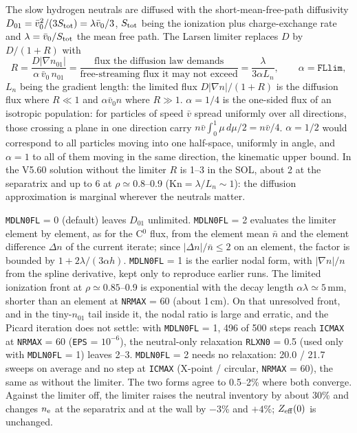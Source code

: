 \documentclass[11pt]{article}
\def\r#1{{\rm#1}}
\def\nee{n_\r{e}}
\begin{document}
The slow hydrogen neutrals are diffused with the short-mean-free-path
diffusivity $D_{01} = \bar v_0^2/(3S_\r{tot}) = \lambda\bar v_0/3$, $S_\r{tot}$ being the
ionization plus charge-exchange rate and $\lambda = \bar v_0/S_\r{tot}$ the mean free
path.  The Larsen limiter replaces $D$ by $D/(1+R)$ with
\[
  R = \frac{D|\nabla n_{01}|}{\alpha\,\bar v_0\, n_{01}}
    = \frac{\mbox{flux the diffusion law demands}}{\mbox{free-streaming flux it may not exceed}}
    = \frac{\lambda}{3\alpha L_n},\qquad \alpha = \texttt{FLlim},
\]
$L_n$ being the gradient length: the limited flux $D|\nabla n|/(1+R)$ is the
diffusion flux where $R\ll1$ and $\alpha\bar v_0 n$ where $R\gg1$.  $\alpha = 1/4$ is
the one-sided flux of an isotropic population: for particles of speed $\bar v$
spread uniformly over all directions, those crossing a plane in one direction
carry $n\bar v\int_0^1\mu\,d\mu/2 = n\bar v/4$.  $\alpha = 1/2$ would correspond to
all particles moving into one half-space, uniformly in angle, and $\alpha = 1$ to
all of them moving in the same direction, the kinematic upper bound.  In the
V5.60 solution without the limiter $R$ is 1--3 in the SOL, about 2 at the
separatrix and up to 6 at $\rho\simeq0.8$--0.9 ($\mathrm{Kn} = \lambda/L_n\sim1$): the
diffusion approximation is marginal wherever the neutrals matter.

\texttt{MDLN0FL} = 0 (default) leaves $D_{01}$ unlimited.  \texttt{MDLN0FL} = 2 evaluates
the limiter element by element, as for the C$^0$ flux, from the element mean
$\bar n$ and the element difference $\Delta n$ of the current iterate; since
$|\Delta n|/\bar n\le2$ on an element, the factor is bounded by
$1 + 2\lambda/(3\alpha h)$.  \texttt{MDLN0FL} = 1 is the earlier nodal form, with
$|\nabla n|/n$ from the spline derivative, kept only to reproduce earlier runs.
The limited ionization front at $\rho\simeq0.85$--0.9 is exponential with the decay
length $\alpha\lambda\simeq5$\,mm, shorter than an element at \texttt{NRMAX} = 60
(about 1\,cm).  On that unresolved front, and in the tiny-$n_{01}$ tail inside it,
the nodal ratio is large and erratic, and the Picard iteration does not settle:
with \texttt{MDLN0FL} = 1, 496 of 500 steps reach \texttt{ICMAX} at \texttt{NRMAX} = 60
(\texttt{EPS} = $10^{-6}$), the neutral-only relaxation \texttt{RLXN0} = 0.5 (used only with
\texttt{MDLN0FL} = 1) leaves 2--3.  \texttt{MDLN0FL} = 2 needs no relaxation: 20.0 / 21.7
sweeps on average and no step at \texttt{ICMAX} (X-point / circular, \texttt{NRMAX} = 60),
the same as without the limiter.  The two forms agree to 0.5--2\% where both
converge.  Against the limiter off, the limiter raises the neutral inventory by
about 30\% and changes $\nee$ at the separatrix and at the wall by $-3$\% and
$+4$\%; $Z_\r{eff}(0)$ is unchanged.
\end{document}

